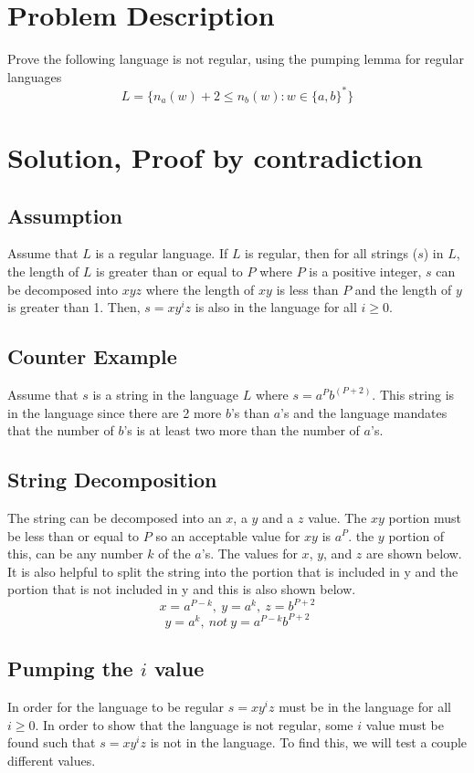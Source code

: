 \documentclass{assignment-x}
\begin{document}
\maketitle
\pagebreak

\section{Problem Description}
Prove the following language is not regular, using the pumping lemma for regular languages
$$L = \{n_a(w)+2 \leq n_b(w): w \in \{a,b\}^*\}$$

\section{Solution, Proof by contradiction}
\subsection{Assumption}
Assume that $L$ is a regular language. If $L$ is regular, then for all strings ($s$) in $L$, the length of $L$ is greater than or equal to $P$ where $P$ is a positive integer, $s$ can be decomposed into $xyz$ where the length of $xy$ is less than $P$ and the length of $y$ is greater than 1. Then, $s=xy^iz$ is also in the language for all $i \geq 0$.

\subsection{Counter Example}
Assume that $s$ is a string in the language $L$ where $s = a^P b^{(P+2)}$. This string is in the language since there are 2 more $b$'s than $a$'s and the language mandates that the number of $b$'s is at least two more than the number of $a$'s.

\subsection{String Decomposition}
The string can be decomposed into an $x$, a $y$ and a $z$ value. The $xy$ portion must be less than or equal to $P$ so an acceptable value for $xy$ is $a^P$. the $y$ portion of this, can be any number $k$ of the $a$'s. The values for $x$, $y$, and $z$ are shown below. It is also helpful to split the string into the portion that is included in y and the portion that is not included in y and this is also shown below.
\[ x=a^{P-k},\ y=a^k,\ z=b^{P+2}\]
\[y = a^k,\ not\ y = a^{P-k}b^{P+2} \]

\subsection{Pumping the $i$ value}
In order for the language to be regular $s=xy^iz$ must be in the language for all $i \geq 0$. In order to show that the language is not regular, some $i$ value must be found such that $s=xy^iz$ is not in the language. To find this, we will test a couple different values.
\end{document}
